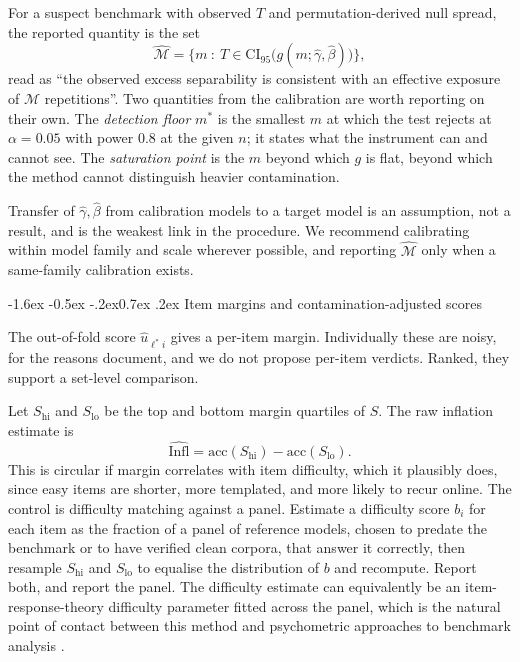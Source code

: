 \documentclass[10pt,twocolumn,letterpaper]{article}
\makeatletter
\renewcommand\subsection{\@startsection{subsection}{2}{\z@}%
  {-1.6ex \@plus -0.5ex \@minus -.2ex}{0.7ex \@plus .2ex}%
  {\normalfont\normalsize\bfseries}}
\makeatother
\begin{document}
For a suspect benchmark with observed $T$ and permutation-derived null spread, the reported quantity is the set
\begin{equation}
\widehat{\mathcal{M}} = \{m\ :\ T \in \mathrm{CI}_{95}\big(g(m;\hat\gamma,\hat\beta)\big)\},
\end{equation}
read as ``the observed excess separability is consistent with an effective exposure of $\widehat{\mathcal{M}}$ repetitions''. Two quantities from the calibration are worth reporting on their own. The \emph{detection floor} $m^{*}$ is the smallest $m$ at which the test rejects at $\alpha=0.05$ with power $0.8$ at the given $n$; it states what the instrument can and cannot see. The \emph{saturation point} is the $m$ beyond which $g$ is flat, beyond which the method cannot distinguish heavier contamination.

Transfer of $\hat\gamma,\hat\beta$ from calibration models to a target model is an assumption, not a result, and is the weakest link in the procedure. We recommend calibrating within model family and scale wherever possible, and reporting $\widehat{\mathcal{M}}$ only when a same-family calibration exists.

\subsection{Item margins and contamination-adjusted scores}
\label{sec:adjusted}

The out-of-fold score $\hat u_{\ell^{*}i}$ gives a per-item margin. Individually these are noisy, for the reasons \citet{duan2024mia} document, and we do not propose per-item verdicts. Ranked, they support a set-level comparison.

Let $S_{\mathrm{hi}}$ and $S_{\mathrm{lo}}$ be the top and bottom margin quartiles of $S$. The raw inflation estimate is
\begin{equation}
\widehat{\mathrm{Infl}} = \mathrm{acc}(S_{\mathrm{hi}}) - \mathrm{acc}(S_{\mathrm{lo}}).
\end{equation}
This is circular if margin correlates with item difficulty, which it plausibly does, since easy items are shorter, more templated, and more likely to recur online. The control is difficulty matching against a panel. Estimate a difficulty score $b_i$ for each item as the fraction of a panel of reference models, chosen to predate the benchmark or to have verified clean corpora, that answer it correctly, then resample $S_{\mathrm{hi}}$ and $S_{\mathrm{lo}}$ to equalise the distribution of $b$ and recompute. Report both, and report the panel. The difficulty estimate can equivalently be an item-response-theory difficulty parameter fitted across the panel, which is the natural point of contact between this method and psychometric approaches to benchmark analysis \cite{polo2024tinybenchmarks}.
\end{document}
